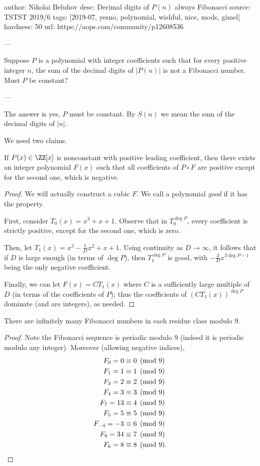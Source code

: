 author: Nikolai Beluhov
desc: Decimal digits of $P(n)$ always Fibonacci
source: TSTST 2019/6
tags: [2019-07, yesno, polynomial, wishful, nice, mods, gimel]
hardness: 50
url: https://aops.com/community/p12608536

---

Suppose $P$ is a polynomial with integer coefficients
such that for every positive integer $n$,
the sum of the decimal digits of $|P(n)|$
is not a Fibonacci number.
Must $P$ be constant?

---

The answer is yes, $P$ must be constant.
By $S(n)$ we mean the sum of the decimal digits of $|n|$.

We need two claims.
\begin{claim*}
  If $P(x) \in \ZZ[x]$ is nonconstant with
  positive leading coefficient,
  then there exists an integer polynomial $F(x)$
  such that all coefficients of $P \circ F$
  are positive except for the second one, which is negative.
\end{claim*}
\begin{proof}
  We will actually construct a cubic $F$.
  We call a polynomial \emph{good} if it has the property.

  First, consider $T_0(x) = x^3+x+1$.
  Observe that in $T_0^{\deg P}$,
  every coefficient is strictly positive,
  except for the second one, which is zero.

  Then, let $T_1(x) = x^3 - \frac1D x^2 + x + 1$.
  Using continuity as $D \to \infty$,
  it follows that if $D$ is large enough (in terms of $\deg P$),
  then $T_1^{\deg P}$ is good,
  with $-\frac3D x^{3\deg P-1}$ being the only negative coefficient.

  Finally, we can let $F(x) = CT_1(x)$
  where $C$ is a sufficiently large multiple of $D$
  (in terms of the coefficients of $P$);
  thus the coefficients of $(CT_1(x))^{\deg P}$ dominate
  (and are integers), as needed.
\end{proof}
\begin{claim*}
  There are infinitely many Fibonacci numbers
  in each residue class modulo $9$.
\end{claim*}
\begin{proof}
  Note the Fibonacci sequence is periodic modulo $9$
  (indeed it is periodic modulo any integer).
  Moreover (allowing negative indices),
  \begin{align*}
    F_{0} = 0 &\equiv 0 \pmod 9 \\
    F_{1} = 1 &\equiv 1 \pmod 9 \\
    F_{3} = 2 &\equiv 2 \pmod 9 \\
    F_{4} = 3 &\equiv 3 \pmod 9 \\
    F_{7} = 13 &\equiv 4 \pmod 9 \\
    F_{5} = 5 &\equiv 5 \pmod 9 \\
    F_{-4} = -3 &\equiv 6 \pmod 9 \\
    F_{9} = 34 &\equiv 7 \pmod 9 \\
    F_{6} = 8 &\equiv 8 \pmod 9. \qedhere
  \end{align*}
\end{proof}

